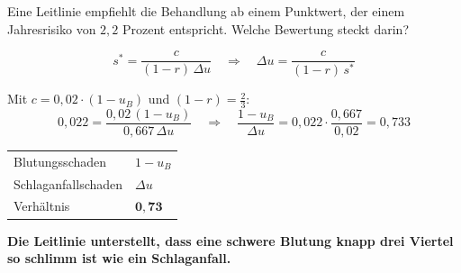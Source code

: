 \begin{aufgabe}
Eine Leitlinie empfiehlt die Behandlung ab einem Punktwert, der einem Jahresrisiko von $2{,}2$ Prozent entspricht. Welche Bewertung steckt darin?

\loesung
{}
\[ s^{*} = \frac{c}{(1-r)\,\Delta u} \quad\Longrightarrow\quad \Delta u = \frac{c}{(1-r)\,s^{*}} \]

Mit $c = 0{,}02\cdot(1-u_B)$ und $(1-r) = \tfrac23$:
\[ 0{,}022 = \frac{0{,}02\,(1-u_B)}{0{,}667\,\Delta u} \quad\Longrightarrow\quad \frac{1-u_B}{\Delta u} = 0{,}022\cdot\frac{0{,}667}{0{,}02} = 0{,}733 \]

\begin{center}
{\small
\renewcommand{\arraystretch}{1.48}
\begin{tabular}{@{}P{3.4cm}P{2.6cm}@{}}
\toprule
Blutungsschaden & $1-u_B$\\
Schlaganfallschaden & $\Delta u$\\
\midrule
Verhältnis & $\mathbf{0{,}73}$\\
\bottomrule
\end{tabular}}
\end{center}

\begin{center}
\begin{minipage}{0.9\textwidth}
\textbf{Die Leitlinie unterstellt, dass eine schwere Blutung knapp drei Viertel so schlimm ist wie ein Schlaganfall.}
\end{minipage}
\end{center}

\begin{center}
\begin{minipage}{0.88\textwidth}
\end{minipage}
\end{center}
\end{aufgabe}

